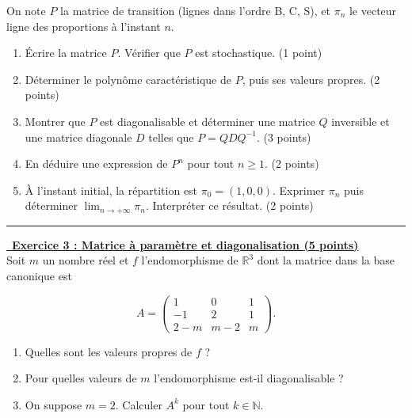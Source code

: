 \documentclass[a4paper,11pt]{article}
\begin{document}
On note $P$ la matrice de transition (lignes dans l'ordre B, C, S), et $\pi_n$ le vecteur ligne des proportions à l'instant $n$.

\begin{enumerate}
    \item Écrire la matrice $P$. Vérifier que $P$ est stochastique. (1 point)
    \item Déterminer le polynôme caractéristique de $P$, puis ses valeurs propres. (2 points)
    \item Montrer que $P$ est diagonalisable et déterminer une matrice $Q$ inversible et une matrice diagonale $D$ telles que $P=QDQ^{-1}$. (3 points)
    \item En déduire une expression de $P^n$ pour tout $n\geq 1$. (2 points)
    \item À l'instant initial, la répartition est $\pi_0=(1,0,0)$. Exprimer $\pi_n$ puis déterminer $\displaystyle\lim_{n\to +\infty}\pi_n$. Interpréter ce résultat. (2 points)
\end{enumerate}

\hfill\break
\hrule
\hfill\break
\newpage

\underline {\, \bf{Exercice 3 : Matrice à paramètre et diagonalisation } \bf{(5 points)}}\\
\medskip
Soit $m$ un nombre réel et $f$ l'endomorphisme de $\mathbb{R}^3$ dont la matrice dans la base canonique est

$$
A=\left(\begin{array}{rcc}
1 & 0 & 1 \\
-1 & 2 & 1 \\
2-m & m-2 & m
\end{array}\right) .
$$

\begin{enumerate}
    \item Quelles sont les valeurs propres de $f$ ?
    \item Pour quelles valeurs de $m$ l'endomorphisme est-il diagonalisable ?
    \item On suppose $m=2$. Calculer $A^k$ pour tout $k \in \mathbb{N}$.
\end{enumerate}
\end{document}
